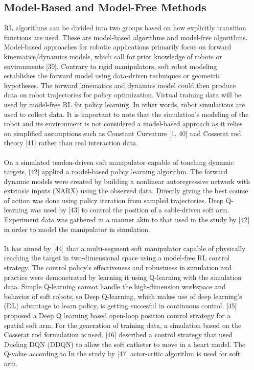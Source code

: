 \documentclass[12pt,twoside,a4]{mwbk}
\begin{document}
\subsection{Model-Based and Model-Free Methods}
RL algorithms can be divided into two groups based on how explicitly transition functions are used. These are model-based algorithms and model-free algorithms. Model-based approaches for robotic applications primarily focus on forward kinematics/dynamics models, which call for prior knowledge of robots or environments [39]. Contrary to rigid manipulators, soft robot modeling establishes the forward model using data-driven techniques or geometric hypotheses. The forward kinematics and dynamics model could then produce data on robot trajectories for policy optimization. Virtual training data will be used by model-free RL for policy learning. In other words, robot simulations are used to collect data. It is important to note that the simulation's modeling of the robot and its environment is not considered a model-based approach as it relies on simplified assumptions such as Constant Curvature [1, 40] and Cosserat rod theory [41] rather than real interaction data.
\\ \\
On a simulated tendon-driven soft manipulator capable of touching dynamic targets, [42] applied a model-based policy learning algorithm. The forward dynamic models were created by building a nonlinear autoregressive network with extrinsic inputs (NARX) using the observed data. Directly giving the best course of action was done using policy iteration from sampled trajectories. Deep Q-learning was used by [43] to control the position of a cable-driven soft arm. Experiment data was gathered in a manner akin to that used in the study by [42] in order to model the manipulator in simulation.
\\ \\
It has aimed by [44] that a multi-segment soft manipulator capable of physically reaching the target in two-dimensional space using a model-free RL control strategy. The control policy's effectiveness and robustness in simulation and practice were demonstrated by learning it using Q-learning with the simulation data. Simple Q-learning cannot handle the high-dimension workspace and behavior of soft robots, so Deep Q-learning, which makes use of deep learning's (DL) advantage to learn policy, is getting succesful in continuous control. [45] proposed a Deep Q learning based open-loop position control strategy for a spatial soft arm. For the generation of training data, a simulation based on the Cosserat rod formulation is used. [46] described a control strategy that used Dueling DQN (DDQN) to allow the soft catheter to move in a heart model. The Q-value according to In the study by [47] actor-critic algorithm is used for soft arm.  
\end{document}
